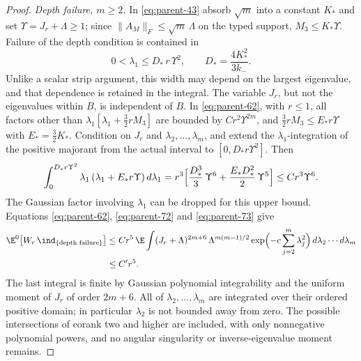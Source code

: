 \begin{proof}
\emph{Depth failure, $m\ge2$.} In \eqref{eq:parent-43} absorb $\sqrt m$ into a constant $K_*$ and set $\Upsilon=J_r+\Lambda\ge1$; since $\|A_M\|_F\le\sqrt m\,\Lambda$ on the typed support, $M_3\le K_*\Upsilon$. Failure of the depth condition is contained in
\begin{equation}\label{eq:parent-71}
0<\lambda_1\le D_*\,r\,\Upsilon^2,\qquad D_*=\frac{4K_*^2}{3k_-}.
\end{equation}
Unlike a scalar strip argument, this width may depend on the largest eigenvalue, and that dependence is retained in the integral. The variable $J_r$, but not the eigenvalues within $B$, is independent of $B$. In \eqref{eq:parent-62}, with $r\le1$, all factors other than $\lambda_1[\lambda_1+\frac32rM_3]$ are bounded by $Cr^2\Upsilon^{2m}$, and $\frac32rM_3\le E_*r\Upsilon$ with $E_*=\frac32K_*$. Condition on $J_r$ and $\lambda_2,\dots,\lambda_m$, and extend the $\lambda_1$-integration of the positive majorant from the actual interval to $[0,D_*r\Upsilon^2]$. Then
\begin{equation}\label{eq:parent-73}
\int_0^{D_*r\Upsilon^2}\lambda_1\,(\lambda_1+E_*r\Upsilon)\,d\lambda_1=r^3\Bigl[\frac{D_*^3}3\,\Upsilon^6+\frac{E_*D_*^2}2\,\Upsilon^5\Bigr]\le Cr^3\Upsilon^6 .
\end{equation}
The Gaussian factor involving $\lambda_1$ can be dropped for this upper bound. Equations \eqref{eq:parent-62}, \eqref{eq:parent-72} and \eqref{eq:parent-73} give
\begin{equation}\label{eq:parent-74}
\begin{aligned}
\E^0\bigl[W_r\,\ind_{\{\text{depth failure}\}}\bigr]&\le Cr^5\,\E\int(J_r+\Lambda)^{2m+6}\,\Lambda^{m(m-1)/2}\exp\Bigl(-c\sum_{j=2}^m\lambda_j^2\Bigr)\,d\lambda_2\cdots d\lambda_m\\
&\le C'r^5 .
\end{aligned}
\end{equation}
The last integral is finite by Gaussian polynomial integrability and the uniform moment of $J_r$ of order $2m+6$. All of $\lambda_2,\dots,\lambda_m$ are integrated over their ordered positive domain; in particular $\lambda_2$ is not bounded away from zero. The possible intersections of corank two and higher are included, with only nonnegative polynomial powers, and no angular singularity or inverse-eigenvalue moment remains.


\end{proof}
